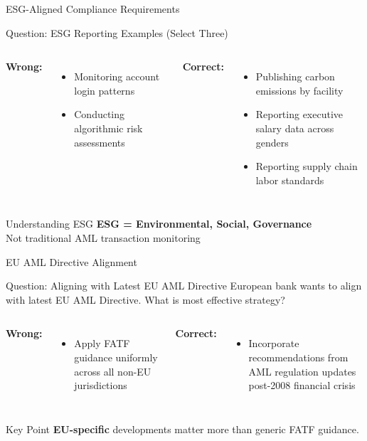 \documentclass{beamer}
\begin{document}
\begin{frame}{ESG-Aligned Compliance Requirements}
\begin{block}{Question: ESG Reporting Examples (Select Three)}
\end{block}

\begin{columns}
\textcolor{wrong}{\textbf{ Wrong:}}
\begin{itemize}
    \item Monitoring account login patterns
    \item Conducting algorithmic risk assessments
\end{itemize}

\textcolor{correct}{\textbf{Correct:}}
\begin{itemize}
    \item Publishing carbon emissions by facility
    \item Reporting executive salary data across genders
    \item Reporting supply chain labor standards
\end{itemize}
\end{columns}

\begin{block}{Understanding ESG}
\textbf{ESG = Environmental, Social, Governance} \\
Not traditional AML transaction monitoring
\end{block}
\end{frame}

\begin{frame}{EU AML Directive Alignment}
\begin{block}{Question: Aligning with Latest EU AML Directive}
\small{European bank wants to align with latest EU AML Directive. What is most effective strategy?}
\end{block}

\begin{columns}
\textcolor{wrong}{\textbf{ Wrong:}}
\begin{itemize}
    \item Apply FATF guidance uniformly across all non-EU jurisdictions
\end{itemize}

\textcolor{correct}{\textbf{Correct:}}
\begin{itemize}
    \item Incorporate recommendations from AML regulation updates post-2008 financial crisis
\end{itemize}
\end{columns}

\begin{block}{Key Point}
\textbf{EU-specific} developments matter more than generic FATF guidance.
\end{block}
\end{frame}
\end{document}
